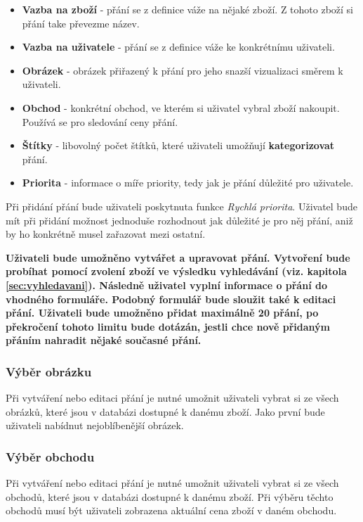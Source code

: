 \begin{itemize}
\item \textbf{Vazba na zboží} - přání se z definice váže na nějaké zboží. Z tohoto zboží si přání take převezme název.
\item \textbf{Vazba na uživatele} - přání se z definice váže ke konkrétnímu uživateli.
\item \textbf{Obrázek} - obrázek přiřazený k přání pro jeho snazší vizualizaci směrem k uživateli.
\item \textbf{Obchod} - konkrétní obchod, ve kterém si uživatel vybral zboží nakoupit. Používá se pro sledování ceny přání.
\item \textbf{Štítky} - libovolný počet štítků, které uživateli umožňují \textbf{kategorizovat} přání.
\item \textbf{Priorita} - informace o míře priority, tedy jak je přání důležité pro uživatele.
\end{itemize}

Při přidání přání bude uživateli poskytnuta funkce \emph{Rychlá priorita}. Uživatel bude mít při přidání možnost jednoduše rozhodnout jak důležité je pro něj přání, aniž by ho konkrétně musel zařazovat mezi ostatní.

\textbf{Uživateli bude umožněno vytvářet a upravovat přání. Vytvoření bude probíhat pomocí zvolení zboží ve výsledku vyhledávání (viz. kapitola \ref{sec:vyhledavani}). Následně uživatel vyplní informace o přání do vhodného formuláře. Podobný formulář bude sloužit také k editaci přání. Uživateli bude umožněno přidat maximálně 20 přání, po překročení tohoto limitu bude dotázán, jestli chce nově přidaným přáním nahradit nějaké současné přání.}

\subsubsection{Výběr obrázku}
Při vytváření nebo editaci přání je nutné umožnit uživateli vybrat si ze všech obrázků, které jsou v databázi dostupné k danému zboží. Jako první bude uživateli nabídnut nejoblíbenější obrázek.

\subsubsection{Výběr obchodu}
Při vytváření nebo editaci přání je nutné umožnit uživateli vybrat si ze všech obchodů, které jsou v databázi dostupné k danému zboží. Při výběru těchto obchodů musí být uživateli zobrazena aktuální cena zboží v daném obchodu.

